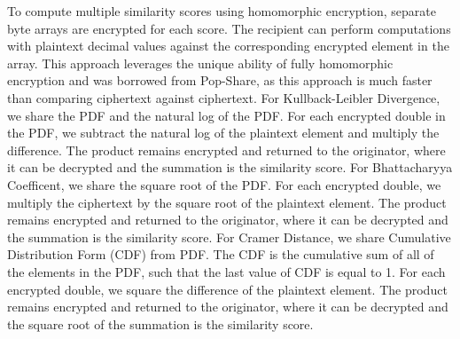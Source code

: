 To compute multiple similarity scores using homomorphic encryption, separate byte arrays are encrypted for each score. The recipient can perform computations with plaintext decimal values against the corresponding encrypted element in the array. This approach leverages the unique ability of fully homomorphic encryption and was borrowed from Pop-Share, as this approach is much faster than comparing ciphertext against ciphertext. 
For Kullback-Leibler Divergence, we share the PDF and the natural log of the PDF. For each encrypted double in the PDF, we subtract the natural log of the plaintext element and multiply the difference. The product remains encrypted and returned to the originator, where it can be decrypted and the summation is the similarity score.
For Bhattacharyya Coefficent, we share the square root of the PDF. For each encrypted double, we multiply the ciphertext by the square root of the plaintext element. The product remains encrypted and returned to the originator, where it can be decrypted and the summation is the similarity score.
For Cramer Distance, we share Cumulative Distribution Form (CDF) from PDF. The CDF is the cumulative sum of all of the elements in the PDF, such that the last value of CDF is equal to 1. For each encrypted double, we square the difference of the plaintext element. The product remains encrypted and returned to the originator, where it can be decrypted and the square root of the summation is the similarity score.
